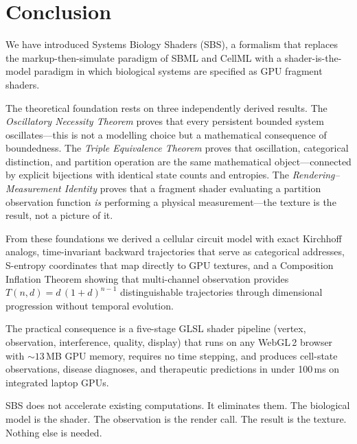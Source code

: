 \documentclass[11pt,twocolumn,a4paper]{article}
\begin{document}
\section{Conclusion}
\label{sec:conclusion}

We have introduced Systems Biology Shaders (SBS), a formalism that
replaces the markup-then-simulate paradigm of SBML and CellML with a
shader-is-the-model paradigm in which biological systems are specified
as GPU fragment shaders.

The theoretical foundation rests on three independently derived
results.  The \emph{Oscillatory Necessity Theorem} proves that every
persistent bounded system oscillates---this is not a modelling
choice but a mathematical consequence of boundedness.  The
\emph{Triple Equivalence Theorem} proves that oscillation, categorical
distinction, and partition operation are the same mathematical
object---connected by explicit bijections with identical state counts
and entropies.  The \emph{Rendering--Measurement Identity} proves that
a fragment shader evaluating a partition observation function
\emph{is} performing a physical measurement---the texture is the
result, not a picture of it.

From these foundations we derived a cellular circuit model with exact
Kirchhoff analogs, time-invariant backward trajectories that serve as
categorical addresses, S-entropy coordinates that map directly to GPU
textures, and a Composition Inflation Theorem showing that
multi-channel observation provides $T(n,d) = d\,(1+d)^{n-1}$
distinguishable trajectories through dimensional progression without
temporal evolution.

The practical consequence is a five-stage GLSL shader pipeline
(vertex, observation, interference, quality, display) that runs on any
WebGL\,2 browser with $\sim\!13$\,MB GPU memory, requires no time
stepping, and produces cell-state observations, disease diagnoses, and
therapeutic predictions in under 100\,ms on integrated laptop GPUs.

SBS does not accelerate existing computations.  It eliminates them.
The biological model is the shader.  The observation is the render
call.  The result is the texture.  Nothing else is needed.





\end{document}
